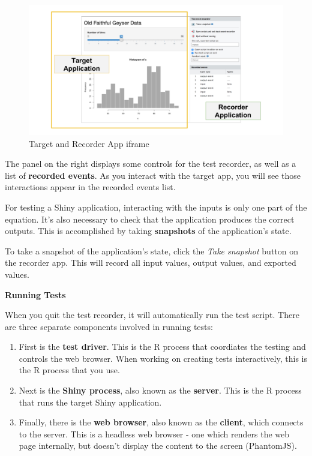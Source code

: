 \documentclass[]{book}
\providecommand{\tightlist}{%
  \setlength{\itemsep}{0pt}\setlength{\parskip}{0pt}}
\theoremstyle{definition}
\theoremstyle{definition}
\theoremstyle{definition}
\theoremstyle{remark}
\begin{document}
\begin{figure}
\centering
\includegraphics{imgs/testing/recorder_and_target.png}
\caption{Target and Recorder App iframe}
\end{figure}

The panel on the right displays some controls for the test recorder, as
well as a list of \textbf{recorded events}. As you interact with the
target app, you will see those interactions appear in the recorded
events list.

For testing a Shiny application, interacting with the inputs is only one
part of the equation. It's also necessary to check that the application
produces the correct outputs. This is accomplished by taking
\textbf{snapshots} of the application's state.

To take a snapshot of the application's state, click the \emph{Take
snapshot} button on the recorder app. This will record all input values,
output values, and exported values.

\textbf{Running Tests}

When you quit the test recorder, it will automatically run the test
script. There are three separate components involved in running tests:

\begin{enumerate}
\def\labelenumi{\arabic{enumi}.}
\tightlist
\item
  First is the \textbf{test driver}. This is the R process that
  coordiates the testing and controls the web browser. When working on
  creating tests interactively, this is the R process that you use.
\item
  Next is the \textbf{Shiny process}, also known as the \textbf{server}.
  This is the R process that runs the target Shiny application.
\item
  Finally, there is the \textbf{web browser}, also known as the
  \textbf{client}, which connects to the server. This is a headless web
  browser - one which renders the web page internally, but doesn't
  display the content to the screen (PhantomJS).
\end{enumerate}
\end{document}

